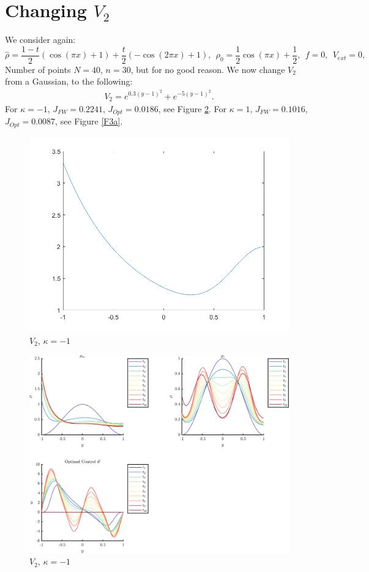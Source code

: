 \documentclass[11pt, a4paper]{article}
\theoremstyle{definition}
\begin{document}
\section{Changing $V_2$}
We consider again:\\
\begin{equation*}
\widehat \rho = \frac{1-t}{2}\left(\cos(\pi x) + 1 \right) + \frac{t}{2}\left(-\cos(2 \pi x) + 1 \right), \ \
\rho_{0} = \frac{1}{2}\cos(\pi x) + \frac{1}{2},\ \
f =0,\ \
V_{ext} =0,
\end{equation*}
Number of points $N=40$, $n=30$, but for no good reason.
We now change $V_2$ from a Gaussian, to the following:
\begin{align*}
V_2 = e^{0.3(y-1)^2} + e^{-5(y-1)^2}.
\end{align*}
For $\kappa = -1$, $J_{FW} = 0.2241$, $J_{Opt} = 0.0186$, see Figure \ref{F3}.
For $\kappa = 1$, $J_{FW} = 0.1016$, $J_{Opt} = 0.0087$, see Figure \ref{F3a}.
\begin{figure}[h]
	\centering
	\includegraphics[scale=0.5]{V2.png}
	\caption{$V_{2}$, $\kappa = -1$} 
	\label{F30}
\end{figure}
\begin{figure}[h]
	\centering
	\includegraphics[scale=0.055]{V21.png}
	\caption{$V_{2}$, $\kappa = -1$} 
	\label{F3}
\end{figure}
\end{document}
